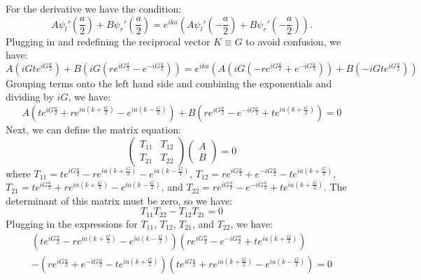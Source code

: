 \documentclass[12pt]{article}
\begin{document}
For the derivative we have the condition:
\begin{equation}
    A\psi_l'(\frac{a}{2}) + B\psi_r'(\frac{a}{2}) = e^{ika}\left(A\psi_l'(-\frac{a}{2}) + B\psi_r'(-\frac{a}{2})\right).
\end{equation}
Plugging in and redefining the reciprocal vector $K\equiv G$ to avoid confusion, we have:
\begin{equation}
    A\left(iGte^{iG\frac{a}{2}}\right) + B\left(iG\left(re^{iG\frac{a}{2}} - e^{-iG\frac{a}{2}}\right)\right) = e^{ika}\left(A\left(iG\left(-re^{iG\frac{a}{2}} + e^{-iG\frac{a}{2}}\right)\right) + B\left(-iGte^{iG\frac{a}{2}}\right)\right)
\end{equation}
Grouping terms onto the left hand side and combining the exponentials and dividing by $iG$, we have:
\begin{equation}
    A\left(t e^{iG\frac{a}{2}} + re^{ia\left(k+\frac{G}{2} \right)} - e^{ia\left(k-\frac{G}{2} \right)}\right) + B\left(re^{iG\frac{a}{2}} - e^{-iG\frac{a}{2}} + te^{ia\left(k+\frac{G}{2} \right)}\right) = 0
\end{equation}
Next, we can define the matrix equation:
\begin{equation}
    \begin{pmatrix}
        T_{11} & T_{12} \\
        T_{21} & T_{22}
    \end{pmatrix}
    \begin{pmatrix}
        A \\
        B
    \end{pmatrix} = 0
\end{equation}
where $T_{11} = t e^{iG\frac{a}{2}} - re^{ia\left(k+\frac{G}{2} \right)} - e^{ia\left(k-\frac{G}{2} \right)}$, $T_{12} = re^{iG\frac{a}{2}} + e^{-iG\frac{a}{2}} - te^{ia\left(k+\frac{G}{2} \right)}$, $T_{21} = t e^{iG\frac{a}{2}} + re^{ia\left(k+\frac{G}{2} \right)} - e^{ia\left(k-\frac{G}{2} \right)}$, and $T_{22} = re^{iG\frac{a}{2}} - e^{-iG\frac{a}{2}} + te^{ia\left(k+\frac{G}{2} \right)}$. The determinant of this matrix must be zero, so we have:
\begin{equation}
    T_{11}T_{22} - T_{12}T_{21} = 0
\end{equation}
Plugging in the expressions for $T_{11}$, $T_{12}$, $T_{21}$, and $T_{22}$, we have:
\begin{align}
    \left(t e^{iG\frac{a}{2}} - re^{ia\left(k+\frac{G}{2} \right)} - e^{ia\left(k-\frac{G}{2} \right)}\right) \left(re^{iG\frac{a}{2}} - e^{-iG\frac{a}{2}} + te^{ia\left(k+\frac{G}{2} \right)}\right)\\ - \left(re^{iG\frac{a}{2}} + e^{-iG\frac{a}{2}} - te^{ia\left(k+\frac{G}{2} \right)}\right) \left(t e^{iG\frac{a}{2}} + re^{ia\left(k+\frac{G}{2} \right)} - e^{ia\left(k-\frac{G}{2} \right)}\right) = 0
\end{align}
\end{document}
